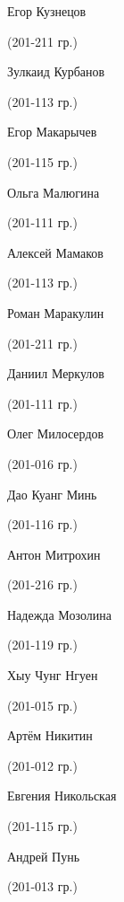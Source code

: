 \begin{multicols}{2}
\begin{small}
\begin{enumerate*}
	\item Егор Кузнецов\begin{tiny} (201-211 гр.)\end{tiny}
	\item Зулкаид Курбанов\begin{tiny} (201-113 гр.)\end{tiny}
	\item Егор Макарычев\begin{tiny} (201-115 гр.)\end{tiny}
	\item Ольга Малюгина\begin{tiny} (201-111 гр.)\end{tiny}
	\item Алексей Мамаков\begin{tiny} (201-113 гр.)\end{tiny}
	\item Роман Маракулин\begin{tiny} (201-211 гр.)\end{tiny}
	\item Даниил Меркулов\begin{tiny} (201-111 гр.)\end{tiny}
	\item Олег Милосердов\begin{tiny} (201-016 гр.)\end{tiny}
	\item Дао Куанг Минь\begin{tiny} (201-116 гр.)\end{tiny}
	\item Антон Митрохин\begin{tiny} (201-216 гр.)\end{tiny}
	\item Надежда Мозолина\begin{tiny} (201-119 гр.)\end{tiny}
	\item Хыу Чунг Нгуен\begin{tiny} (201-015 гр.)\end{tiny}
	\item Артём Никитин\begin{tiny} (201-012 гр.)\end{tiny}
	\item Евгения Никольская\begin{tiny} (201-115 гр.)\end{tiny}
	\item Андрей Пунь\begin{tiny} (201-013 гр.)\end{tiny}

\end{enumerate*}
\end{small}
\end{multicols}

